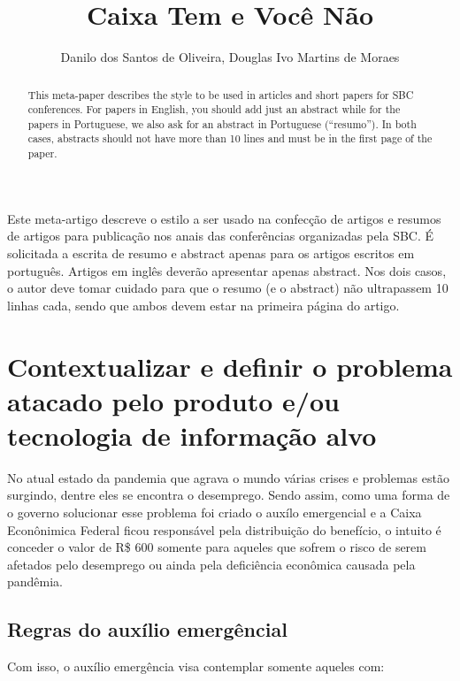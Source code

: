 \documentclass[12pt]{article}
\begin{document}
 
     
\sloppy

\title{Caixa Tem e Você Não}

\author{Danilo dos Santos de Oliveira, Douglas Ivo Martins de Moraes}

\maketitle

\begin{abstract}
  This meta-paper describes the style to be used in articles and short papers
  for SBC conferences. For papers in English, you should add just an abstract
  while for the papers in Portuguese, we also ask for an abstract in
  Portuguese (``resumo''). In both cases, abstracts should not have more than
  10 lines and must be in the first page of the paper.
\end{abstract}
     
\begin{resumo}
  Este meta-artigo descreve o estilo a ser usado na confecção de artigos e
  resumos de artigos para publicação nos anais das conferências organizadas
  pela SBC. É solicitada a escrita de resumo e abstract apenas para os artigos
  escritos em português. Artigos em inglês deverão apresentar apenas abstract.
  Nos dois casos, o autor deve tomar cuidado para que o resumo (e o abstract)
  não ultrapassem 10 linhas cada, sendo que ambos devem estar na primeira
  página do artigo.
\end{resumo}


\section{Contextualizar e definir o problema atacado pelo produto e/ou tecnologia de informação alvo} \label{sec:firstpage}

	No atual estado da pandemia que agrava o mundo várias crises e problemas estão surgindo, dentre eles se encontra o desemprego. Sendo assim, como uma forma de o governo solucionar esse problema foi criado o auxílo emergencial e a Caixa Econônimica Federal ficou responsável pela distribuição do benefício, o intuito é conceder o valor de R\$ 600 somente para aqueles que sofrem o risco de serem afetados pelo desemprego ou ainda pela deficiência econômica causada pela pandêmia.

\subsection{Regras do auxílio emergêncial}	
Com isso, o auxílio emergência visa contemplar somente aqueles com:                                 
\end{document}
